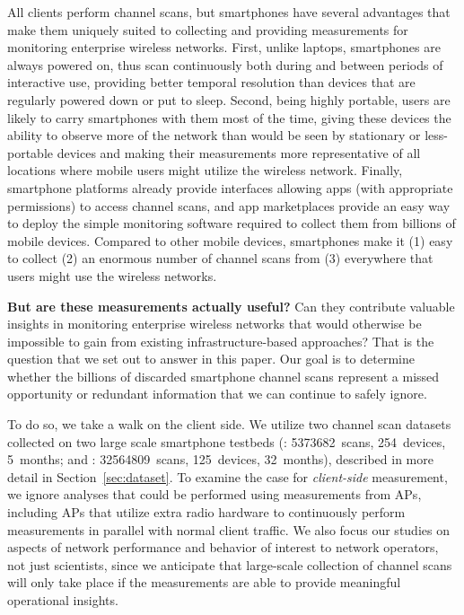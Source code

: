 All \wifi{} clients perform channel scans, but smartphones have several
advantages that make them uniquely suited to collecting and providing
measurements for monitoring enterprise wireless networks. First, unlike laptops,
smartphones are always powered on, thus scan continuously both during and
between periods of interactive use, providing better temporal resolution than
devices that are regularly powered down or put to sleep. Second, being highly portable, users
are likely to carry smartphones with them most of the time, giving these devices
the ability to observe more of the network than would be seen by stationary or
less-portable devices and making their measurements more representative of all
locations where mobile users might utilize the wireless network. Finally,
smartphone platforms already provide interfaces allowing apps (with appropriate
permissions) to access channel scans, and app marketplaces provide an easy way
to deploy the simple monitoring software required to collect them from billions of
mobile devices. Compared to other mobile devices, smartphones make it (1) easy
to collect (2) an enormous number of channel scans from (3) everywhere that
users might use the wireless networks.

\textbf{But are these measurements actually useful?} Can they contribute
valuable insights in monitoring enterprise wireless networks that would
otherwise be impossible to gain from existing infrastructure-based approaches?
That is the question that we set out to answer in this paper. Our goal is to
determine whether the billions of discarded smartphone channel scans represent a
missed opportunity or redundant information that we can continue to safely
ignore.

To do so, we take a walk on the client side. We utilize two \wifi{} channel scan
datasets collected on two large scale smartphone testbeds (\PhoneLab{}:
\num{5373682}~scans, 254~devices, 5~months; and \NetSense{}:
\num{32564809}~scans, 125~devices, 32~months), described in more detail in
Section~\ref{sec:dataset}. To examine the case for \textit{client-side}
measurement, we ignore analyses that could be performed using measurements from
APs, including APs that utilize extra radio hardware to
continuously perform measurements in parallel with normal client traffic. We
also focus our studies on aspects of network performance and behavior of
interest to network operators, not just scientists, since we anticipate that
large-scale collection of channel scans will only take place if the measurements
are able to provide meaningful operational insights.


